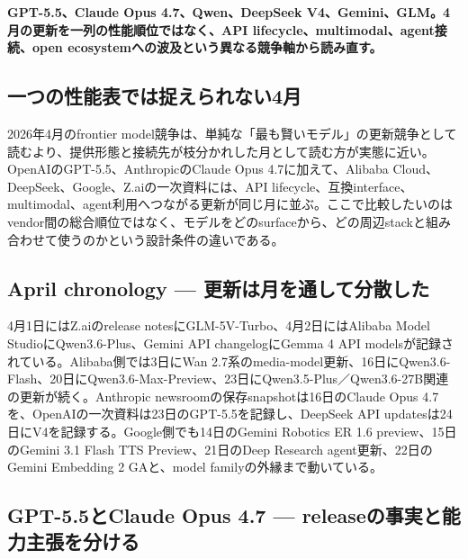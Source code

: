 \noindent\textbf{GPT-5.5、Claude Opus 4.7、Qwen、DeepSeek V4、Gemini、GLM。4月の更新を一列の性能順位ではなく、API lifecycle、multimodal、agent接続、open ecosystemへの波及という異なる競争軸から読み直す。}\autocite{src-9156c37fb1c2,src-a24fd97eb3d0,src-dfe7e0c6ff39,src-e547d0d8cbe3,src-eac8dfbeb78c,src-f6aa679babd7}

\subsection{一つの性能表では捉えられない4月}

2026年4月のfrontier model競争は、単純な「最も賢いモデル」の更新競争として読むより、提供形態と接続先が枝分かれした月として読む方が実態に近い。OpenAIのGPT-5.5、AnthropicのClaude Opus 4.7に加えて、Alibaba Cloud、DeepSeek、Google、Z.aiの一次資料には、API lifecycle、互換interface、multimodal、agent利用へつながる更新が同じ月に並ぶ。ここで比較したいのはvendor間の総合順位ではなく、モデルをどのsurfaceから、どの周辺stackと組み合わせて使うのかという設計条件の違いである。\autocite{src-9156c37fb1c2,src-a24fd97eb3d0,src-dfe7e0c6ff39,src-e547d0d8cbe3,src-eac8dfbeb78c,src-f6aa679babd7}


\subsection{April chronology — 更新は月を通して分散した}

4月1日にはZ.aiのrelease notesにGLM-5V-Turbo、4月2日にはAlibaba Model StudioにQwen3.6-Plus、Gemini API changelogにGemma 4 API modelsが記録されている。Alibaba側では3日にWan 2.7系のmedia-model更新、16日にQwen3.6-Flash、20日にQwen3.6-Max-Preview、23日にQwen3.5-Plus／Qwen3.6-27B関連の更新が続く。Anthropic newsroomの保存snapshotは16日のClaude Opus 4.7を、OpenAIの一次資料は23日のGPT-5.5を記録し、DeepSeek API updatesは24日にV4を記録する。Google側でも14日のGemini Robotics ER 1.6 preview、15日のGemini 3.1 Flash TTS Preview、21日のDeep Research agent更新、22日のGemini Embedding 2 GAと、model familyの外縁まで動いている。\autocite{src-9156c37fb1c2,src-a24fd97eb3d0,src-dfe7e0c6ff39,src-e547d0d8cbe3,src-eac8dfbeb78c,src-f6aa679babd7}


\subsection{GPT-5.5とClaude Opus 4.7 — releaseの事実と能力主張を分ける}

